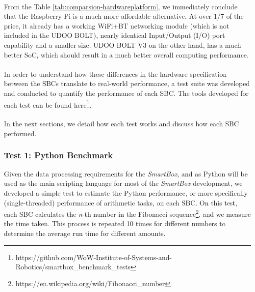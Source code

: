 \paragraph{} From the Table \ref{tab:comparsion-hardwareplatform}, we immediately conclude that the Raspberry Pi is a much more affordable alternative. At over 1/7 of the price, it already has a working WiFi+BT networking module (which is not included in the UDOO BOLT), nearly identical Input/Output (I/O) port capability and a smaller size. UDOO BOLT V3 on the other hand, has a much better SoC, which should result in a much better overall computing performance.


\paragraph{} In order to understand how these differences in the hardware specification between the \acs{SBC}s translate to real-world performance, a test suite was developed and conducted to quantify the performance of each \acs{SBC}. The tools developed for each test can be found here\footnote{https://github.com/WoW-Institute-of-Systems-and-Robotics/smartbox\_benchmark\_tests}. 

\paragraph{}In the next sections, we detail how each test works and discuss how each \acs{SBC} performed. 

\subsubsection{Test 1: Python Benchmark}

Given the data processing requirements for the \textit{SmartBox}, and as Python will be used as the main scripting language for most of the \textit{SmartBox} development, we developed a simple test to estimate the Python performance, or more specifically (single-threaded) performance of arithmetic tasks, on each \acs{SBC}. On this test, each \acs{SBC} calculates the \textit{n}-th number in the Fibonacci sequence\footnote{https://en.wikipedia.org/wiki/Fibonacci\_number}, and we measure the time taken. This process is repeated 10 times for different numbers to determine the average run time for different amounts.


